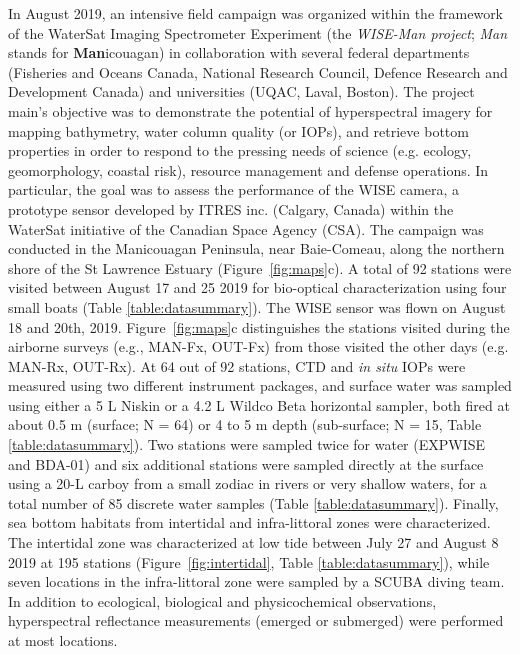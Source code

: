 \documentclass[essd, manuscript]{copernicus}
\begin{document}
In August 2019, an intensive field campaign was organized within the framework of the WaterSat Imaging Spectrometer Experiment (the \textit{WISE-Man project}; \textit{Man} stands for \textbf{Man}icouagan) in collaboration with several federal departments (Fisheries and Oceans Canada, National Research Council, Defence Research and Development Canada) and universities (UQAC, Laval, Boston). %
The project main's objective was to demonstrate the potential of hyperspectral imagery for mapping bathymetry, water column quality (or IOPs), and retrieve bottom properties in order to respond to the pressing needs of science (e.g. ecology, geomorphology, coastal risk), resource management and defense operations.  In particular, the goal was to assess the performance of the WISE camera, a prototype sensor developed by ITRES inc. (Calgary, Canada) within the WaterSat initiative of the Canadian Space Agency (CSA). The campaign was conducted in the Manicouagan Peninsula, near Baie-Comeau, along the northern shore of the St Lawrence Estuary (Figure~\ref{fig:maps}c). A total of 92 stations were visited between August 17 and 25 2019 for bio-optical characterization using four small boats (Table \ref{table:datasummary}). The WISE sensor was flown on August 18 and 20th, 2019. Figure~\ref{fig:maps}c distinguishes the stations visited during the airborne surveys (e.g., MAN-Fx, OUT-Fx) from those visited the other days (e.g. MAN-Rx, OUT-Rx). At 64 out of 92 stations, CTD and \textit{in situ} IOPs were measured using two different instrument packages, and surface water was sampled using either a 5 L Niskin or a 4.2 L Wildco Beta horizontal sampler, both fired at about 0.5 m (surface; N = 64) or 4 to 5 m depth (sub-surface; N = 15, Table \ref{table:datasummary}). Two stations were sampled twice for water (EXPWISE and BDA-01) and six additional stations were sampled directly at the surface using a 20-L carboy from a small zodiac in rivers or very shallow waters, for a total number of 85 discrete water samples  (Table \ref{table:datasummary}). Finally, sea bottom habitats from intertidal and infra-littoral zones were characterized. The intertidal zone was characterized at low tide between July 27 and August 8 2019 at 195 stations (Figure~\ref{fig:intertidal}, Table \ref{table:datasummary}), while seven locations in the infra-littoral zone were sampled by a SCUBA diving team.  In addition to ecological, biological and physicochemical observations, hyperspectral reflectance measurements (emerged or submerged) were performed at most locations.\\  
\end{document}
